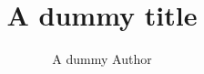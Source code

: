 \documentclass[ngerman]{article}
\title{A dummy title}
\author{A dummy Author}
\begin{document}
  \maketitle
  
  \printnoidxglossaries
  
  
  
  
  
\end{document}
